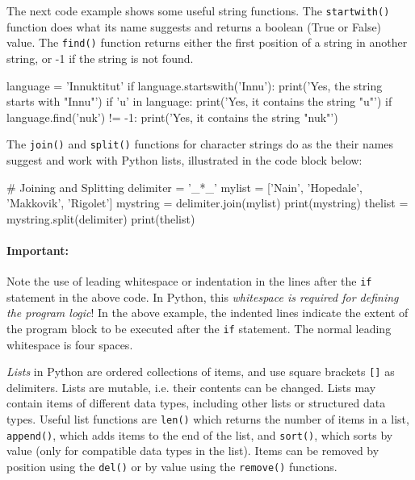 \noindent The next code example shows some useful string functions. The \texttt{startwith()} function does what its name suggests and returns a boolean (True or False) value. The \texttt{find()} function returns either the first position of a string in another string, or -1 if the string is not found. 
\begin{samepage}
\begin{pythoncode}
language = 'Innuktitut'
if language.startswith('Innu'):
    print('Yes, the string starts with "Innu"')
if 'u' in language:
    print('Yes, it contains the string "u"')
if language.find('nuk') != -1:
    print('Yes, it contains the string "nuk"')
\end{pythoncode}
\end{samepage}

The \texttt{join()} and \texttt{split()} functions for character strings do as the their names suggest and work with Python lists, illustrated in the code block below:

\begin{samepage}
\begin{pythoncode}
# Joining and Splitting    
delimiter = '_*_'
mylist = ['Nain', 'Hopedale', 'Makkovik', 'Rigolet']
mystring = delimiter.join(mylist)
print(mystring)
thelist = mystring.split(delimiter)
print(thelist)
\end{pythoncode}
\end{samepage}

\begin{tcolorbox}[colback=alert]
\paragraph{Important:} Note the use of leading whitespace or indentation in the lines after the \texttt{if} statement in the above code. In Python, this \emph{whitespace is required for defining the program logic}! In the above example, the indented lines indicate the extent of the program block to be executed after the \texttt{if} statement. The normal leading whitespace is four spaces. 
\end{tcolorbox}

\emph{Lists} in Python are ordered collections of items, and use square brackets \texttt{[]} as delimiters. Lists are mutable, i.e. their contents can be changed. Lists may contain items of different data types, including other lists or structured data types. Useful list functions are \texttt{len()} which returns the number of items in a list, \texttt{append()}, which adds items to the end of the list, and \texttt{sort()}, which sorts by value (only for compatible data types in the list). Items can be removed by position using the \texttt{del()} or by value using the \texttt{remove()} functions.

